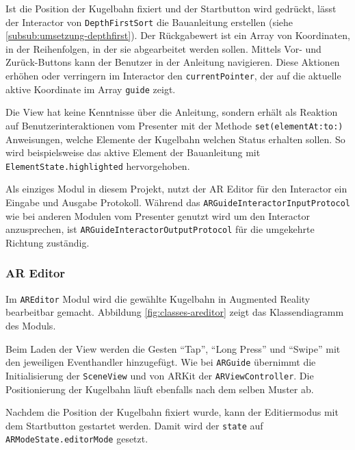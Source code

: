 Ist die Position der Kugelbahn fixiert und der Startbutton wird gedrückt, lässt der Interactor von \texttt{DepthFirstSort} die Bauanleitung erstellen (siehe \ref{subsub:umsetzung-depthfirst}).
Der Rückgabewert ist ein Array von Koordinaten, in der Reihenfolgen, in der sie abgearbeitet werden sollen.
Mittels Vor- und Zurück-Buttons kann der Benutzer in der Anleitung navigieren.
Diese Aktionen erhöhen oder verringern im Interactor den \texttt{currentPointer}, der auf die aktuelle aktive Koordinate im Array \texttt{guide} zeigt.

Die View hat keine Kenntnisse über die Anleitung, sondern erhält als Reaktion auf Benutzerinteraktionen vom Presenter mit der Methode \texttt{set(elementAt:to:)} Anweisungen, welche Elemente der Kugelbahn welchen Status erhalten sollen.
So wird beispielsweise das aktive Element der Bauanleitung mit \texttt{ElementState.highlighted} hervorgehoben.

Als einziges Modul in diesem Projekt, nutzt der AR Editor für den Interactor ein Eingabe und Ausgabe Protokoll.
Während das \texttt{ARGuideInteractorInputProtocol} wie bei anderen Modulen vom Presenter genutzt wird um den Interactor anzusprechen, ist \texttt{ARGuideInteractorOutputProtocol} für die umgekehrte Richtung zuständig.


\subsubsection{AR Editor}

Im \texttt{AREditor} Modul wird die gewählte Kugelbahn in Augmented Reality bearbeitbar gemacht.
Abbildung \ref{fig:classes-areditor} zeigt das Klassendiagramm des Moduls.


Beim Laden der View werden die Gesten "`Tap"', "`Long Press"' und "`Swipe"' mit den jeweiligen Eventhandler hinzugefügt.
Wie bei \texttt{ARGuide} übernimmt die Initialisierung der \texttt{SceneView} und von ARKit der \texttt{ARViewController}.
Die Positionierung der Kugelbahn läuft ebenfalls nach dem selben Muster ab.

Nachdem die Position der Kugelbahn fixiert wurde, kann der Editiermodus mit dem Startbutton gestartet werden.
Damit wird der \texttt{state} auf \texttt{ARModeState.editorMode} gesetzt.


